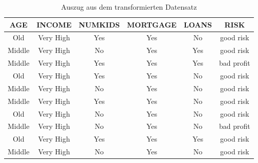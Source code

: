 \begin{center}
    \begin{table}[htbp]
        \begin{tabularx}{\linewidth}{cccccc}
            \toprule
            \textbf{AGE} & \textbf{INCOME} & \textbf{NUMKIDS} & \textbf{MORTGAGE} & \textbf{LOANS} & \textbf{RISK} \\
            \toprule
            Old	    & Very High & Yes   & Yes & No	& good risk     \\
            Middle  & Very High & No    & Yes & Yes	& good risk     \\
            Middle  & Very High & Yes   & Yes & Yes	& bad profit    \\
            Old	    & Very High	& Yes   & Yes & No	& good risk     \\
            Middle  & Very High	& No    & Yes & No	& good risk     \\
            Middle  & Very High	& Yes   & Yes & No	& good risk     \\
            Old	    & Very High	& No    & Yes & No	& good risk     \\
            Middle  & Very High	& No    & Yes & No	& bad profit    \\
            Old	    & Very High	& Yes   & Yes & Yes	& good risk     \\
            Middle	& Very High	& No    & Yes & No	& good risk     \\
            \bottomrule
        \end{tabularx}
        \caption{Auszug aus dem transformierten Datensatz}
        \label{table:datensatz}
    \end{table}
\end{center}
